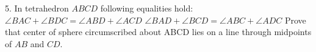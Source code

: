 5. In tetrahedron $ABCD$ following equalities hold:
$\angle BAC+\angle BDC=\angle ABD+\angle ACD$
$\angle BAD+\angle BCD=\angle ABC+\angle ADC$
Prove that center of sphere circumscribed about ABCD lies on a line through midpoints of $AB$ and $CD$.
